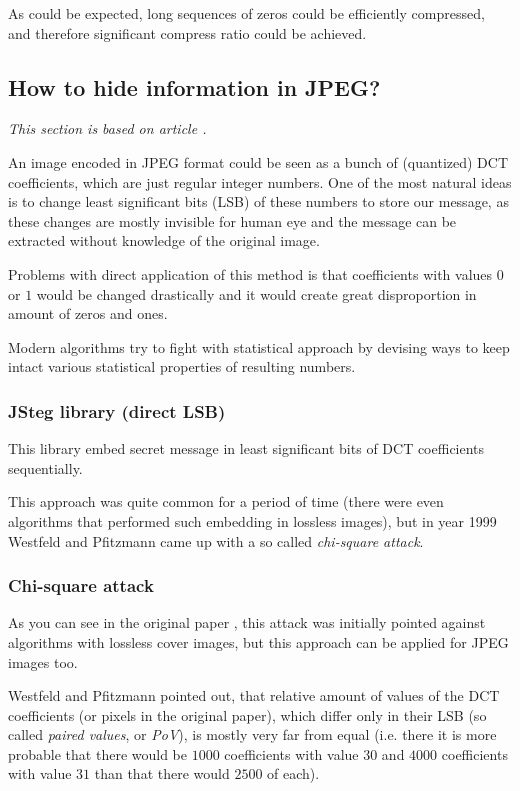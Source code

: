 As could be expected, long sequences of zeros could be efficiently
compressed, and therefore significant compress ratio could be achieved.


\subsection{How to hide information in JPEG?}
\label{sec:how-to-hide-information}

\textit{This section is based on article \cite{liu2008high}.}


An image encoded in JPEG format could be seen as a bunch of (quantized)
DCT coefficients, which are just regular integer numbers. One of the
most natural ideas is to change least significant bits (LSB) of these
numbers to store our message, as these changes are mostly invisible
for human eye and the message can be extracted without knowledge of
the original image.

Problems with direct application of this method is that coefficients with values
$0$ or $1$ would be changed drastically and it would create great disproportion
in amount of zeros and ones.

Modern algorithms try to fight with statistical approach by devising ways to
keep intact various statistical properties of resulting numbers. 

\subsubsection{JSteg library (direct LSB)}

This library embed secret message in least significant bits of DCT coefficients sequentially.

This approach was quite common for a period of time (there were even algorithms that performed such embedding
in lossless images), but in year 1999 Westfeld and Pfitzmann came up with a so called \textit{chi-square attack}.

\subsubsection{Chi-square attack}

As you can see in the original paper \cite{westfeld1999attacks}, 
this attack was initially pointed against algorithms with lossless cover images, 
but this approach can be applied for JPEG images too.

Westfeld and Pfitzmann pointed out, that relative amount of values of the DCT coefficients (or pixels in the original paper), 
which differ only in their LSB (so called \textit{paired values}, or \textit{PoV}), is mostly very far from equal 
(i.e. there it is more probable that there would be $1000$ coefficients with value $30$ and $4000$ coefficients with value $31$
than that there would $2500$ of each).

